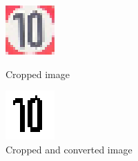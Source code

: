 \begin{figure}[H]
	\includegraphics[width=\linewidth]{images/2020.png}
	\caption{Cropped image}\label{fig:2020}
	\endminipage\hfill
	\includegraphics[width=\linewidth]{images/binaryimg.png}
	\caption{Cropped and converted image}\label{fig:2020bin}
	\endminipage\hfill
	\newline
	
\end{figure}


